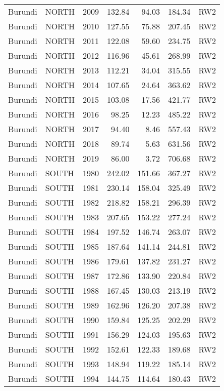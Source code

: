 \begin{longtable}{lllrrrl}
  Burundi & NORTH & 2009 & 132.84 & 94.03 & 184.34 & RW2 \\ 
  Burundi & NORTH & 2010 & 127.55 & 75.88 & 207.45 & RW2 \\ 
  Burundi & NORTH & 2011 & 122.08 & 59.60 & 234.75 & RW2 \\ 
  Burundi & NORTH & 2012 & 116.96 & 45.61 & 268.99 & RW2 \\ 
  Burundi & NORTH & 2013 & 112.21 & 34.04 & 315.55 & RW2 \\ 
  Burundi & NORTH & 2014 & 107.65 & 24.64 & 363.62 & RW2 \\ 
  Burundi & NORTH & 2015 & 103.08 & 17.56 & 421.77 & RW2 \\ 
  Burundi & NORTH & 2016 & 98.25 & 12.23 & 485.22 & RW2 \\ 
  Burundi & NORTH & 2017 & 94.40 & 8.46 & 557.43 & RW2 \\ 
  Burundi & NORTH & 2018 & 89.74 & 5.63 & 631.56 & RW2 \\ 
  Burundi & NORTH & 2019 & 86.00 & 3.72 & 706.68 & RW2 \\ 
  Burundi & SOUTH & 1980 & 242.02 & 151.66 & 367.27 & RW2 \\ 
  Burundi & SOUTH & 1981 & 230.14 & 158.04 & 325.49 & RW2 \\ 
  Burundi & SOUTH & 1982 & 218.82 & 158.21 & 296.39 & RW2 \\ 
  Burundi & SOUTH & 1983 & 207.65 & 153.22 & 277.24 & RW2 \\ 
  Burundi & SOUTH & 1984 & 197.52 & 146.74 & 263.07 & RW2 \\ 
  Burundi & SOUTH & 1985 & 187.64 & 141.14 & 244.81 & RW2 \\ 
  Burundi & SOUTH & 1986 & 179.61 & 137.82 & 231.27 & RW2 \\ 
  Burundi & SOUTH & 1987 & 172.86 & 133.90 & 220.84 & RW2 \\ 
  Burundi & SOUTH & 1988 & 167.45 & 130.03 & 213.19 & RW2 \\ 
  Burundi & SOUTH & 1989 & 162.96 & 126.20 & 207.38 & RW2 \\ 
  Burundi & SOUTH & 1990 & 159.84 & 125.25 & 202.29 & RW2 \\ 
  Burundi & SOUTH & 1991 & 156.29 & 124.03 & 195.63 & RW2 \\ 
  Burundi & SOUTH & 1992 & 152.61 & 122.33 & 189.68 & RW2 \\ 
  Burundi & SOUTH & 1993 & 148.94 & 119.22 & 185.14 & RW2 \\ 
  Burundi & SOUTH & 1994 & 144.75 & 114.64 & 180.43 & RW2 \\ 

\end{longtable}
